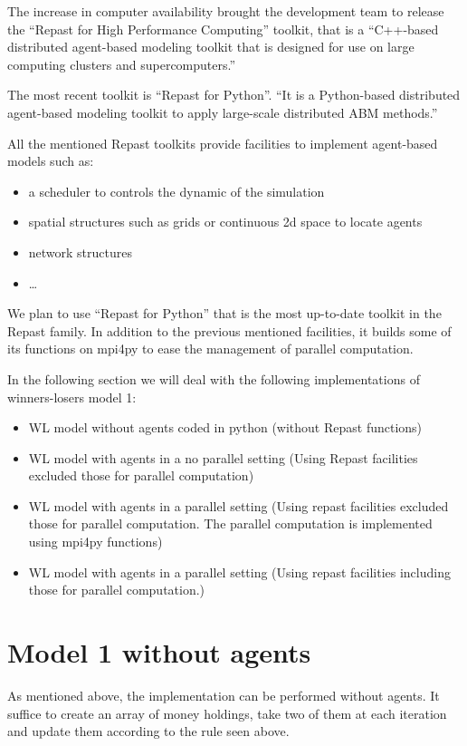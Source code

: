 \documentclass{article}
\providecommand{\tightlist}{%
  \setlength{\itemsep}{0pt}\setlength{\parskip}{0pt}}
\begin{document}
The increase in computer availability brought the development team to release the ``Repast for High Performance Computing'' toolkit, that is a ``C++-based distributed agent-based modeling toolkit that is designed for use on large computing clusters and supercomputers.'' 

The most recent toolkit is ``Repast for Python''. ``It is a Python-based distributed agent-based modeling toolkit to apply large-scale distributed ABM methods.'' 

All the mentioned Repast toolkits provide facilities to implement agent-based models such as:
\begin{itemize}
\tightlist
	\item a scheduler to controls the dynamic of the simulation
	\item spatial structures such as grids or continuous 2d space to locate agents
	\item network structures
	\item \ldots
\end{itemize}

We plan to use ``Repast for Python'' that is the most up-to-date toolkit in the Repast family. In addition to the previous mentioned facilities, it builds some of its functions on mpi4py to ease the management of parallel computation.

In the following section we will deal with the following implementations of winners-losers model 1:
\begin{itemize}
	\item WL model without agents coded in python (without Repast functions)
	\item WL model with agents in a no parallel setting (Using Repast facilities excluded those for parallel computation)
	\item WL model with agents in a parallel setting (Using repast facilities excluded those for parallel computation. The parallel computation is implemented using mpi4py functions)
	\item WL model with agents in a parallel setting (Using repast facilities including those for parallel computation.)
\end{itemize}

\section{Model 1 without agents}\label{sec:model1withoutagents}

As mentioned above, the implementation can be performed without agents.
It suffice to create an array of money holdings, take two of them at each iteration and update them according to the rule seen above.
\end{document}
